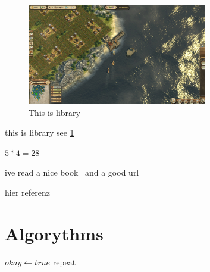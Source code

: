 \documentclass[11pt]{article}
\begin{document}
    \begin{figure}[htbp]
        \begin{center}
            \includegraphics[width=0.7\textwidth]{Anno 1404 - History Edition2021-2-2-1-53-42}
            \caption{This is library}
        \end{center}
        \label{fig:Images}
    \end{figure}

    this is library see \ref{fig:Images}

    $5*4=28$


    ive read a nice book~\cite{two}
    and a good url~\cite{Doe:2009:Online}

    hier referenz~\cite{tollesbuch}


    \section{Algorythms}
    \begin{algorithmic}
            \State $okay \gets true$
            \else
                \State repeat
            \EndWhile
        \EndIf
    \end{algorithmic}

    \clearpage
\end{document}
